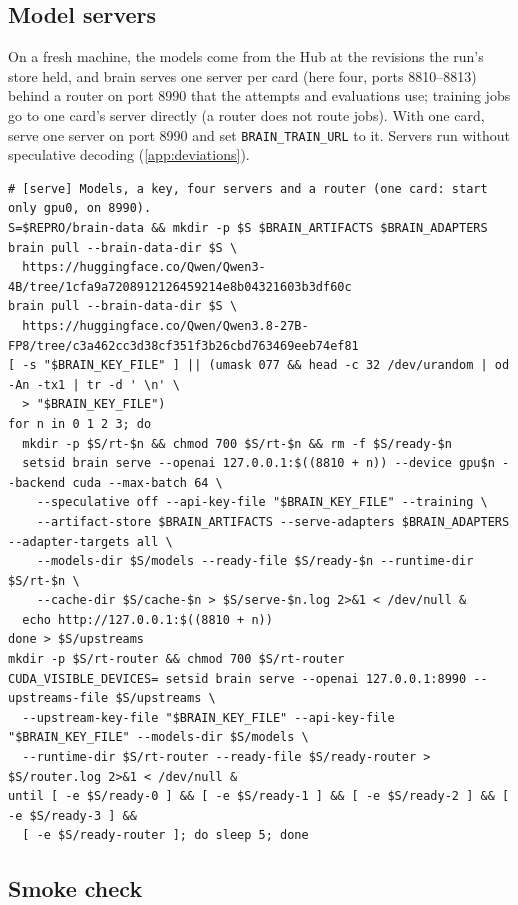 \subsection{Model servers}\label{app:repro-vim-serve}

\begin{sloppypar}
On a fresh machine, the models come from the Hub at the revisions the run's store held, and brain serves one server per card
(here four, ports 8810--8813) behind a router on port 8990 that the attempts and evaluations use; training jobs go to one card's
server directly (a router does not route jobs). With one card, serve one server on port 8990 and set
\texttt{BRAIN\_TRAIN\_URL} to it. Servers run without speculative decoding (\cref{app:deviations}).
\end{sloppypar}

{\scriptsize
\begin{verbatim}
# [serve] Models, a key, four servers and a router (one card: start only gpu0, on 8990).
S=$REPRO/brain-data && mkdir -p $S $BRAIN_ARTIFACTS $BRAIN_ADAPTERS
brain pull --brain-data-dir $S \
  https://huggingface.co/Qwen/Qwen3-4B/tree/1cfa9a7208912126459214e8b04321603b3df60c
brain pull --brain-data-dir $S \
  https://huggingface.co/Qwen/Qwen3.8-27B-FP8/tree/c3a462cc3d38cf351f3b26cbd763469eeb74ef81
[ -s "$BRAIN_KEY_FILE" ] || (umask 077 && head -c 32 /dev/urandom | od -An -tx1 | tr -d ' \n' \
  > "$BRAIN_KEY_FILE")
for n in 0 1 2 3; do
  mkdir -p $S/rt-$n && chmod 700 $S/rt-$n && rm -f $S/ready-$n
  setsid brain serve --openai 127.0.0.1:$((8810 + n)) --device gpu$n --backend cuda --max-batch 64 \
    --speculative off --api-key-file "$BRAIN_KEY_FILE" --training \
    --artifact-store $BRAIN_ARTIFACTS --serve-adapters $BRAIN_ADAPTERS --adapter-targets all \
    --models-dir $S/models --ready-file $S/ready-$n --runtime-dir $S/rt-$n \
    --cache-dir $S/cache-$n > $S/serve-$n.log 2>&1 < /dev/null &
  echo http://127.0.0.1:$((8810 + n))
done > $S/upstreams
mkdir -p $S/rt-router && chmod 700 $S/rt-router
CUDA_VISIBLE_DEVICES= setsid brain serve --openai 127.0.0.1:8990 --upstreams-file $S/upstreams \
  --upstream-key-file "$BRAIN_KEY_FILE" --api-key-file "$BRAIN_KEY_FILE" --models-dir $S/models \
  --runtime-dir $S/rt-router --ready-file $S/ready-router > $S/router.log 2>&1 < /dev/null &
until [ -e $S/ready-0 ] && [ -e $S/ready-1 ] && [ -e $S/ready-2 ] && [ -e $S/ready-3 ] &&
  [ -e $S/ready-router ]; do sleep 5; done
\end{verbatim}
}

\subsection{Smoke check}\label{app:repro-vim-smoke}

